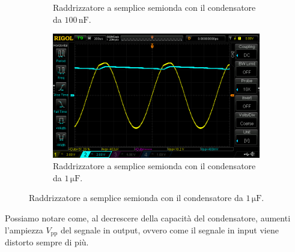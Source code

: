 \documentclass[a4paper]{article}
\begin{document}
\begin{figure}[h!]
\begin{subfigure}{0.4\textwidth}
						\caption{Raddrizzatore a semplice semionda con il condensatore da $ 100 \, \mathrm{nF} $.}
					\end{subfigure}
					\begin{subfigure}{1\textwidth}
						\centering
						\includegraphics[scale=0.4]{raddrizzatoreASempliceSemiondaDiodo1micro}
						\caption{Raddrizzatore a semplice semionda con il condensatore da $ 1 \, \mathrm{\mu F} $.}
					\end{subfigure}
					\label{fig:raddrizzatoreASempliceSemiondaDiodo}
				\end{figure}
				\newpage
				Possiamo notare come, al decrescere della capacità del condensatore, aumenti l'ampiezza $ V_{\mathrm{pp}} $ del segnale in output, ovvero come il segnale in input viene distorto sempre di più.
\end{document}
